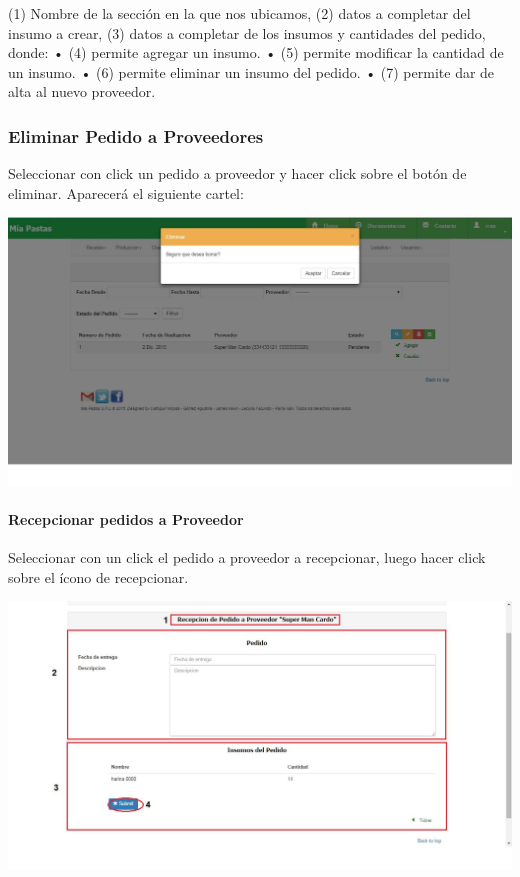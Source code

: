 \documentclass[letterpaper,10pt,english]{sphinxmanual}
\begin{document}
(1) Nombre de la sección en la que nos ubicamos, (2) datos a completar del insumo a crear, (3) datos a completar de los insumos y cantidades del pedido, donde:
•       (4) permite agregar un insumo.
•       (5) permite modificar la cantidad de un insumo.
•       (6) permite eliminar un insumo del pedido.
•       (7) permite dar de alta al nuevo proveedor.


\subsubsection{Eliminar Pedido a Proveedores}
\label{pedidosProveedor:eliminar-pedido-a-proveedores}
Seleccionar con click un pedido a proveedor y hacer click sobre el botón de eliminar. Aparecerá el siguiente cartel:

\includegraphics{pedidos_eliminar.jpg}


\paragraph{{}Recepcionar pedidos a Proveedor}
\label{pedidosProveedor consultarrecepciona::doc}\label{pedidosProveedor consultarrecepciona:recepcionar-pedidos-a-proveedor}
Seleccionar con un click el pedido a proveedor a recepcionar, luego hacer click sobre el ícono de recepcionar.

\includegraphics{pedidos_recepcionar.jpg}
\end{document}
